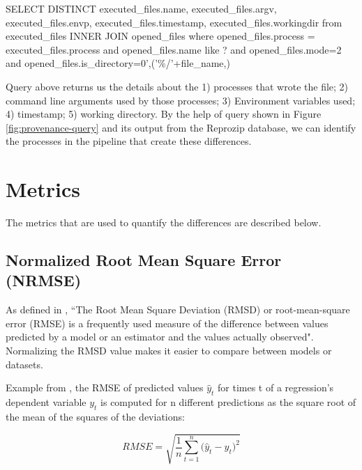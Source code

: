 \begin{tcolorbox}[colback=black!5!white,colframe=black!75!black]
SELECT DISTINCT executed\_files.name, executed\_files.argv, executed\_files.envp, executed\_files.timestamp, executed\_files.workingdir from executed\_files INNER JOIN opened\_files where opened\_files.process = executed\_files.process and opened\_files.name like ? and opened\_files.mode=2 and opened\_files.is\_directory=0',('\%/'+file\_name,)
\end{tcolorbox}
\label{fig:provenance-query}

Query above returns us the details about the 1) processes that wrote the file; 2) command line arguments used by those processes; 3) Environment variables used; 4) timestamp; 5) working directory. By the help of query shown in Figure \ref{fig:provenance-query} and its output from the Reprozip database, we can identify the processes in the pipeline that create these differences.

\section{Metrics} \label{sec:num1}
The metrics that are used to quantify the differences are described below.

\subsection{Normalized Root Mean Square Error (NRMSE)}
As defined in \cite{khosrow2017handbook}, ``The Root Mean Square Deviation (RMSD) or root-mean-square error (RMSE) is a frequently used measure of the difference between values predicted by a model or an estimator and the values actually observed". Normalizing the RMSD value makes it easier to compare between models or datasets.

Example from \cite{NRMSE}, the RMSE of predicted values ${\displaystyle {\hat {y}}_{t}}$  for times t of a regression's dependent variable ${\displaystyle y_{t}}$ is computed for n different predictions as the square root of the mean of the squares of the deviations:\\

\begin{center}
  \begin{equation}
     RMSE = {\sqrt {\frac{1} {n}{\sum\limits_{t = 1}^n {(\hat{y}_{t} - {y}_{t} } })^{2} } }
  \end{equation}
\end{center}

